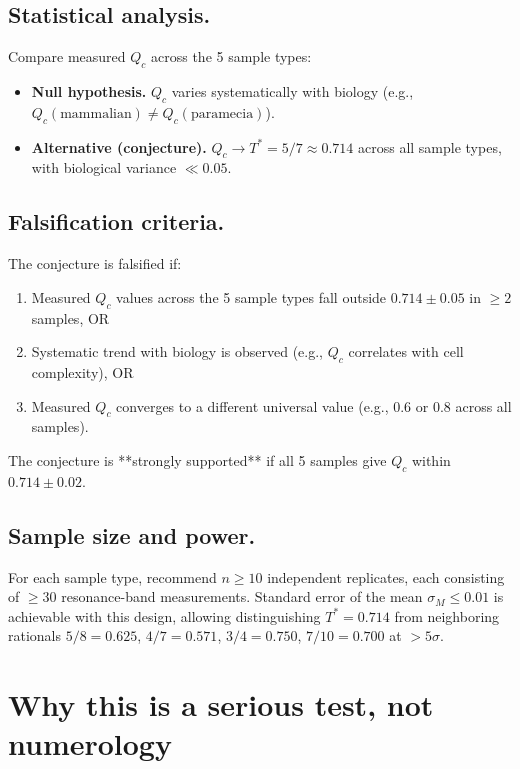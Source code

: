 \documentclass[11pt,reqno]{amsart}
\theoremstyle{plain}
\theoremstyle{definition}
\theoremstyle{remark}
\begin{document}
\subsection{Statistical analysis.}
Compare measured $Q_c$ across the 5 sample types:
\begin{itemize}
\item \textbf{Null hypothesis.} $Q_c$ varies systematically with biology
(e.g., $Q_c(\text{mammalian}) \neq Q_c(\text{paramecia})$).
\item \textbf{Alternative (conjecture).} $Q_c \to T^{*} = 5/7 \approx 0.714$
across all sample types, with biological variance $\ll 0.05$.
\end{itemize}

\subsection{Falsification criteria.}
The conjecture is falsified if:
\begin{enumerate}
\item Measured $Q_c$ values across the 5 sample types fall outside
$0.714 \pm 0.05$ in $\geq 2$ samples, OR
\item Systematic trend with biology is observed (e.g., $Q_c$ correlates
with cell complexity), OR
\item Measured $Q_c$ converges to a different universal value (e.g., 0.6
or 0.8 across all samples).
\end{enumerate}
The conjecture is **strongly supported** if all 5 samples give $Q_c$
within $0.714 \pm 0.02$.

\subsection{Sample size and power.}
For each sample type, recommend $n \geq 10$ independent replicates,
each consisting of $\geq 30$ resonance-band measurements. Standard
error of the mean $\sigma_M \leq 0.01$ is achievable with this design,
allowing distinguishing $T^{*} = 0.714$ from neighboring rationals
$5/8 = 0.625$, $4/7 = 0.571$, $3/4 = 0.750$, $7/10 = 0.700$ at
$> 5\sigma$.

\section{Why this is a serious test, not numerology}
\end{document}
